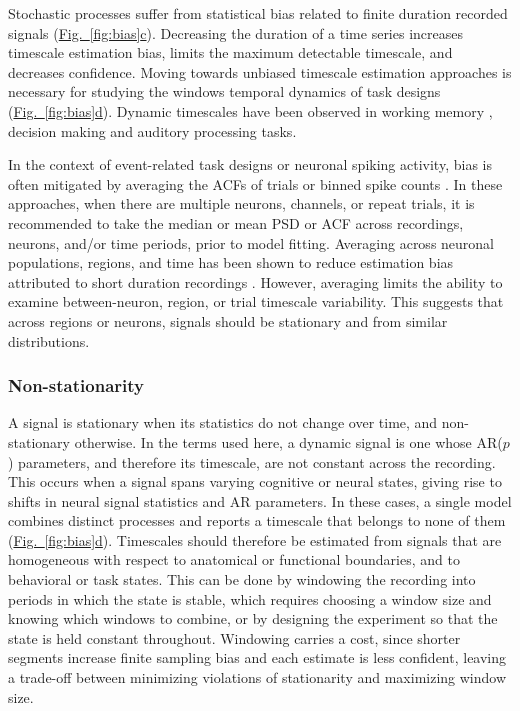 \documentclass[pdflatex,lineno,sn-nature]{sn-jnl}
\newcommand{\figpanel}[3][]{\hyperref[#2]{Fig.~#1\ref*{#2}#3}}
\theoremstyle{thmstyleone}
\theoremstyle{thmstyletwo}
\theoremstyle{thmstylethree}
\begin{document}
Stochastic processes suffer from statistical bias related to finite duration recorded signals (\figpanel{fig:bias}{c}). Decreasing the duration of a time series increases timescale estimation bias, limits the maximum detectable timescale, and decreases confidence. Moving towards unbiased timescale estimation approaches is necessary for studying the windows temporal dynamics of task designs (\figpanel{fig:bias}{d}). Dynamic timescales have been observed in working memory \cite{wasmuht_intrinsic_2018, gao_neuronal_2020}, decision making \cite{ganupuru_flexibility_2019} and auditory processing \cite{chien_constructing_2020} tasks.

In the context of event-related task designs or neuronal spiking activity, bias is often mitigated by averaging the ACFs of trials or binned spike counts \cite{murray_hierarchy_2014}. In these approaches, when there are multiple neurons, channels, or repeat trials, it is recommended to take the median or mean PSD or ACF across recordings, neurons, and/or time periods, prior to model fitting. Averaging across neuronal populations, regions, and time has been shown to reduce estimation bias attributed to short duration recordings \cite{spitzner_mr_2021}. However, averaging limits the ability to examine between-neuron, region, or trial timescale variability. This suggests that across regions or neurons, signals should be stationary and from similar distributions.

\subsubsection{Non-stationarity}

A signal is stationary when its statistics do not change over time, and non-stationary otherwise. In the terms used here, a dynamic signal is one whose AR($p$) parameters, and therefore its timescale, are not constant across the recording. This occurs when a signal spans varying cognitive or neural states, giving rise to shifts in neural signal statistics and AR parameters. In these cases, a single model combines distinct processes and reports a timescale that belongs to none of them (\figpanel{fig:bias}{d}). Timescales should therefore be estimated from signals that are homogeneous with respect to anatomical or functional boundaries, and to behavioral or task states. This can be done by windowing the recording into periods in which the state is stable, which requires choosing a window size and knowing which windows to combine, or by designing the experiment so that the state is held constant throughout. Windowing carries a cost, since shorter segments increase finite sampling bias and each estimate is less confident, leaving a trade-off between minimizing violations of stationarity and maximizing window size.
\end{document}
